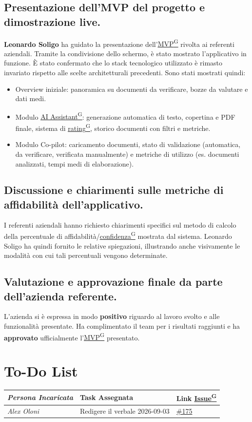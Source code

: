\documentclass[a4paper,12pt]{article}
\providecommand{\glslink}[2]{\href{https://alittlebyte-19.github.io/Documentazione/glossario.html\#gls-#1}{\underline{#2}\textsuperscript{\scriptsize G}}}
\begin{document}
\subsection{Presentazione dell'MVP del progetto e dimostrazione live.}
\textbf{Leonardo Soligo} ha guidato la presentazione dell'\glslink{mvp-minimum-viable-product}{MVP} rivolta ai referenti aziendali. Tramite la condivisione dello schermo, è stato mostrato l'applicativo in funzione. È stato confermato che lo stack tecnologico utilizzato è rimasto invariato rispetto alle scelte architetturali precedenti. Sono stati mostrati quindi:
\begin{itemize}
    \item Overview iniziale: panoramica su documenti da verificare, bozze da valutare e dati medi.
    \item Modulo \glslink{ai-assistant-generativo-ai-assistant}{AI Assistant}: generazione automatica di testo, copertina e PDF finale, sistema di \glslink{rating}{rating}, storico documenti con filtri e metriche.
    \item Modulo Co-pilot: caricamento documenti, stato di validazione (automatica, da verificare, verificata manualmente) e metriche di utilizzo (es. documenti analizzati, tempi medi di elaborazione).
\end{itemize}

\subsection{Discussione e chiarimenti sulle metriche di affidabilità dell'applicativo.}
I referenti aziendali hanno richiesto chiarimenti specifici sul metodo di calcolo della percentuale di affidabilità/\glslink{confidenza-confidence-score}{confidenza} mostrata dal sistema. Leonardo Soligo ha quindi fornito le relative spiegazioni, illustrando anche visivamente le modalità con cui tali percentuali vengono determinate.

\subsection{Valutazione e approvazione finale da parte dell'azienda referente.}
L'azienda si è espressa in modo \textbf{positivo} riguardo al lavoro svolto e alle funzionalità presentate. Ha complimentato il team per i risultati raggiunti e ha \textbf{approvato} ufficialmente l'\glslink{mvp-minimum-viable-product}{MVP} presentato.
\section{To-Do List}
\begin{table}[h]
    \centering
    \begin{tabular}{|p{4.5cm}|p{5cm}|l|}
    \hline
        \rowcolor{lightgray}\textit{\textbf{Persona Incaricata}}  & \textbf{Task Assegnata} &\textbf{Link \glslink{issue}{Issue}} \\
    \hline
        \textit{Alex Oloni} & Redigere il verbale 2026-09-03 & \href{https://github.com/aLittleByte-19/Documentazione/issues/175}{\#175} \\
    \hline
    \end{tabular}
    \label{tab:placeholder}
\end{table}
\end{document}
